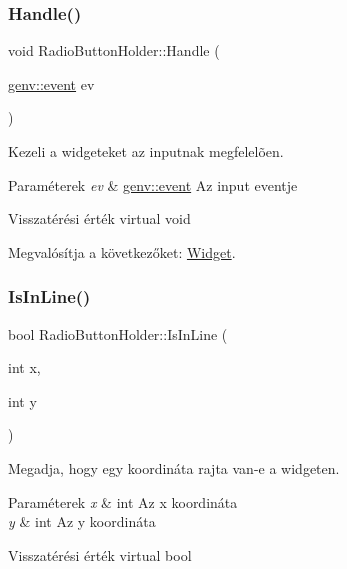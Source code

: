 \subsubsection{\texorpdfstring{Handle()}{Handle()}}
{\footnotesize\ttfamily void Radio\+Button\+Holder\+::\+Handle (\begin{DoxyParamCaption}\item[{\hyperlink{structgenv_1_1event}{genv\+::event}}]{ev }\end{DoxyParamCaption})\hspace{0.3cm}{\ttfamily [virtual]}}



Kezeli a widgeteket az inputnak megfelelõen. 


\begin{DoxyParams}{Paraméterek}
{\em ev} & \hyperlink{structgenv_1_1event}{genv\+::event} Az input eventje \\
\hline
\end{DoxyParams}
\begin{DoxyReturn}{Visszatérési érték}
virtual void 
\end{DoxyReturn}


Megvalósítja a következőket\+: \hyperlink{class_widget_abf512e4606c7a5d44245a9b0246634a0}{Widget}.

\mbox{\label{class_radio_button_holder_aa6d6fe7d9eb9ce9c2628f432ef129e01}} 
\subsubsection{\texorpdfstring{Is\+In\+Line()}{IsInLine()}}
{\footnotesize\ttfamily bool Radio\+Button\+Holder\+::\+Is\+In\+Line (\begin{DoxyParamCaption}\item[{int}]{x,  }\item[{int}]{y }\end{DoxyParamCaption})\hspace{0.3cm}{\ttfamily [virtual]}}



Megadja, hogy egy koordináta rajta van-\/e a widgeten. 


\begin{DoxyParams}{Paraméterek}
{\em x} & int Az x koordináta \\
\hline
{\em y} & int Az y koordináta \\
\hline
\end{DoxyParams}
\begin{DoxyReturn}{Visszatérési érték}
virtual bool 
\end{DoxyReturn}


